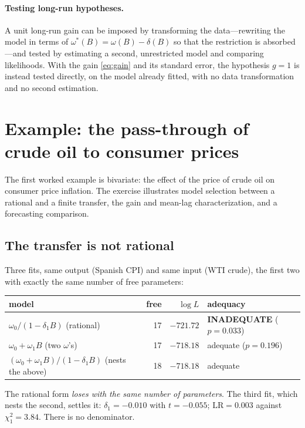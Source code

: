 \documentclass[11pt,a4paper]{article}
\theoremstyle{plain}
\theoremstyle{remark}
\begin{document}
\paragraph{Testing long-run hypotheses.} A unit long-run gain can be imposed by
transforming the data---rewriting the model in terms of $\omega^*(B)=\omega(B)-
\delta(B)$ so that the restriction is absorbed---and tested by estimating a second,
unrestricted model and comparing likelihoods. With the gain \eqref{eq:gain} and its
standard error, the hypothesis $g=1$ is instead tested directly, on the model
already fitted, with no data transformation and no second estimation.

\section{Example: the pass-through of crude oil to consumer prices}
\label{sec:oil}

The first worked example is bivariate: the effect of the price of crude oil on
consumer price inflation. The exercise illustrates model selection between a
rational and a finite transfer, the gain and mean-lag characterization, and a
forecasting comparison.

\subsection{The transfer is not rational}

Three fits, same output (Spanish CPI) and same input (WTI crude), the first two
with exactly the same number of free parameters:

\begin{center}
\begin{tabular}{lrrl}
\toprule
model & free & $\log L$ & adequacy \\
\midrule
$\omega_0/(1-\delta_1 B)$ \quad (rational)      & 17 & $-721.72$ & \textbf{INADEQUATE} ($p=0.033$) \\
$\omega_0 + \omega_1 B$ \quad (two $\omega$'s)  & 17 & $\mathbf{-718.18}$ & adequate ($p=0.196$) \\
$(\omega_0+\omega_1 B)/(1-\delta_1 B)$ \quad (nests the above) & 18 & $-718.18$ & adequate \\
\bottomrule
\end{tabular}
\end{center}

The rational form \emph{loses with the same number of parameters}. The third fit,
which nests the second, settles it: $\delta_1 = -0.010$ with $t=-0.055$;
$\mathrm{LR}=0.003$ against $\chi^2_1=3.84$. There is no denominator.
\end{document}

